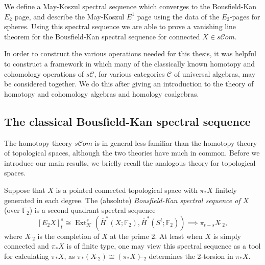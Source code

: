 \documentclass[11pt]{amsart} \renewcommand{\baselinestretch}{1.4}
\theoremstyle{plain}
\theoremstyle{definition}
\DeclareMathOperator{\Ext}{Ext}
\newcommand{\scrC}{\mathscr{C}}
\newcommand{\calk}{\mathcal{K}}
\newcommand{\calc}{\mathcal{C}}
\newcommand{\F}{\mathbb{F}}
\newcommand{\algs}{{\scrC\!\textit{om}}}
\newcommand{\Ftwo}{\F_2}
\newcommand{\E}[5]{[E^{#1}_{#2}#3]^{#4}_{#5}}
\begin{document}
\begin{Introduction}
We define a May-Koszul spectral sequence which converges to the Bousfield-Kan $E_2$ page, and describe the May-Koszul $E^1$ page using the data of the $E_2$-pages for spheres. Using this spectral sequence we are able to prove a vanishing line theorem for the Bousfield-Kan spectral sequence for connected $X\in s\algs$.

In order to construct the  various operations needed for this thesis, it was helpful to construct a framework in which many of the classically known homotopy and cohomology operations of $s\calc$, for various categories $\calc$ of universal algebras, may be considered together. We do this after giving an introduction to the theory of homotopy and cohomology algebras and homology coalgebras.


\subsection{The classical Bousfield-Kan spectral sequence}
\label{Classicalstuff}
The homotopy theory $s\algs$ is in general less familiar than the homotopy theory of topological spaces, although the two theories have much in common. Before we introduce our main results, we briefly recall the analogous theory for topological spaces.

Suppose that $X$ is a pointed connected topological space with $\pi_*X$ finitely generated in each degree. 
The (absolute) \emph{Bousfield-Kan spectral sequence of $X$} (over $\Ftwo$) is a second quadrant spectral sequence
\[\E{}{2}{X}{s}{t}\cong \Ext^s_{\calk}(\overline{H}^*(X;\Ftwo),\overline{H}^*(S^t;\Ftwo))\implies \pi_{t-s}X\hat{\ }_{\!\!\!2},\]
where $X\hat{\ }_{\!\!\!2}$ is the completion of $X$ at the prime 2. 
At least when $X$ is simply connected and $\pi_*X$ is of finite type, one may view this spectral sequence as  a tool for calculating $\pi_*X$, as
$\pi_*(X\hat{\ }_{\!\!\!2})\cong (\pi_*X)\hat{\ }_{\!\!\!2}$
determines the 2-torsion in $\pi_*X$.


\end{Introduction}
\end{document}
